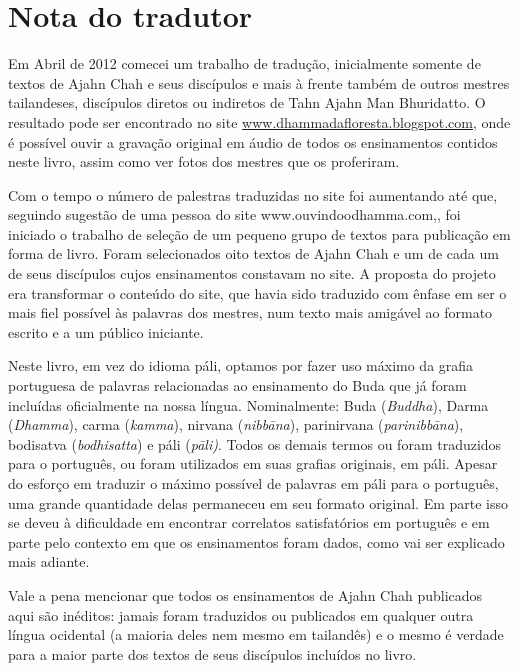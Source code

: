 
\chapter{Nota do tradutor}

Em Abril de 2012 comecei um trabalho de tradução, inicialmente
somente de textos de Ajahn Chah e seus discípulos e mais à frente
também de outros mestres tailandeses, discípulos diretos ou indiretos
de Tahn Ajahn Man Bhuridatto. O resultado pode ser encontrado no site
\href{http://www.dhammadafloresta.blogspot.com/}{www.dhammadafloresta.blogspot.com},
onde é possível ouvir a gravação original em áudio de todos os
ensinamentos contidos neste livro, assim como ver fotos dos mestres que
os proferiram. 

Com o tempo o número de palestras traduzidas no site foi aumentando
até que, seguindo sugestão de uma pessoa do site
www.ouvindoodhamma.com,, foi iniciado o trabalho de seleção de um
pequeno grupo de textos para publicação em forma de livro. Foram
selecionados oito textos de Ajahn Chah e um de cada um de seus
discípulos cujos ensinamentos constavam no site. A proposta do projeto
era transformar o conteúdo do site, que havia sido traduzido com ênfase
em ser o mais fiel possível às palavras dos mestres, num texto mais
amigável ao formato escrito e a um público iniciante. 

Neste livro, em vez do idioma páli, optamos por fazer uso máximo da
grafia portuguesa de palavras relacionadas ao ensinamento do Buda que
já foram incluídas oficialmente na nossa língua. Nominalmente: Buda
(\textit{Buddha}), Darma (\textit{Dhamma}), carma (\textit{kamma}),
nirvana (\textit{nibb\=ana}), parinirvana (\textit{parinibb\=ana}),
bodisatva (\textit{bodhisatta}) e páli (\textit{p\=ali)}. Todos os
demais termos ou foram traduzidos para o português, ou foram utilizados
em suas grafias originais, em páli. Apesar do esforço em traduzir o
máximo possível de palavras em páli para o português, uma grande
quantidade delas permaneceu em seu formato original. Em parte isso se
deveu à dificuldade em encontrar correlatos satisfatórios em português
e em parte pelo contexto em que os ensinamentos foram dados, como vai
ser explicado mais adiante.

Vale a pena mencionar que todos os ensinamentos de Ajahn Chah
publicados aqui são inéditos: jamais foram traduzidos ou publicados em
qualquer outra língua ocidental (a maioria deles nem mesmo em
tailandês) e o mesmo é verdade para a maior parte dos textos de seus
discípulos incluídos no livro. 

